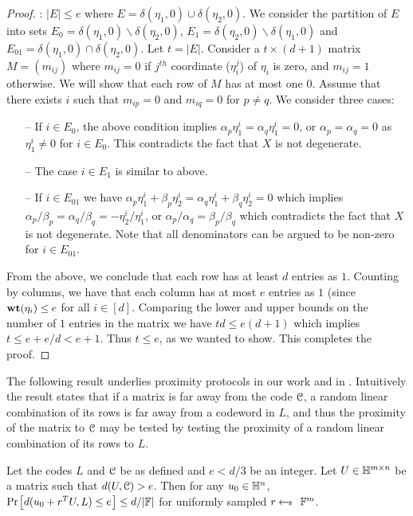\begin{proof}
	: $|E|\leq e$ where $E = \delta(\eta_1,0)\cup
	\delta(\eta_2,0)$. We consider the partition of $E$ into sets
	$E_0=\delta(\eta_1,0)\backslash \delta(\eta_2,0)$,
	$E_1=\delta(\eta_2,0)\backslash \delta(\eta_1,0)$ and
	$E_{01}=\delta(\eta_1,0)\cap \delta(\eta_2,0)$. Let $t=|E|$. Consider a $t\times (d+1)$ matrix $M=(m_{ij})$
	where $m_{ij}=0$ if $j^{th}$ coordinate ($\eta_i^j$) of $\eta_i$ is zero, and $m_{ij}=1$
	otherwise. We will show that each row of $M$ has at most one $0$. Assume that
	there exists $i$ such that $m_{ip}=0$ and $m_{iq}=0$ for $p\neq q$. We consider
	three cases:
	\begin{itemize}
		\item[--] If $i\in E_0$, the above condition implies $\alpha_p\eta_1^i = \alpha_q\eta_1^i=0$, or $\alpha_p=\alpha_q=0$ as $\eta_1^i\neq 0$ for $i\in E_0$.
		This contradicts the fact that $X$ is not degenerate.
		\item[--] The case $i\in E_1$ is similar to above.
		\item[--] If $i\in E_{01}$ we have $\alpha_p\eta_1^i+\beta_p\eta_2^i=\alpha_q\eta_1^i+\beta_q\eta_2^i=0$ which implies $\alpha_p/\beta_p = \alpha_q/\beta_q = -\eta_2^i/\eta_1^i $, or $\alpha_p/\alpha_q = \beta_p/\beta_q$ which contradicts the fact that $X$ is not degenerate. Note that all denominators can be argued to be non-zero for $i\in E_{01}$.
	\end{itemize}
	
	From the above, we conclude that each row has at least $d$ entries as $1$.
	Counting by columns, we have that each column has at most $e$ entries as $1$
	(since $\wt{\eta_i}\leq e$ for all $i\in [d]$. Comparing the lower and upper
	bounds on the number of $1$ entries in the matrix we have $td \leq e(d+1)$
	which implies $t \leq e + e/d < e + 1$. Thus $t\leq e$, as we wanted to show.
	This completes the proof.
\end{proof}
The following result underlies proximity protocols in our work and in
\cite{ligero}. Intuitively the result states that if a matrix is far away from the code $\mc{C}$, a random linear combination of its rows is far away from a codeword in $L$, and thus the proximity of the matrix to $\mc{C}$ may be tested by testing the proximity of a random linear combination of its rows to $L$.
\begin{lemma}\label{lem:affinesubspace}
	Let the codes $L$ and $\mc{C}$ be as defined and $e<d/3$ be an integer. Let $U\in \HH^{m\times n}$ be a matrix such that $d(U,\mc{C})>e$. Then for any $u_0\in \HH^n$, $\prob{d(u_0+r^TU,L)\leq e}\leq d/|\FF|$ for uniformly sampled $r\sample \FF^m$.
\end{lemma}
